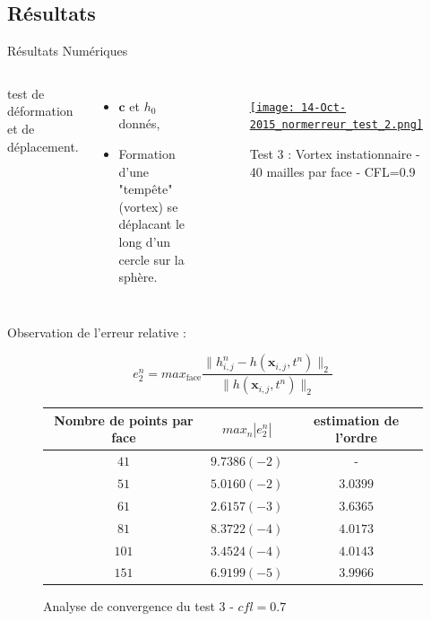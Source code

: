 \documentclass[11pt]{beamer}
\begin{document}
\subsection{Résultats}
\begin{frame}{Résultats Numériques}
\begin{columns}
test de déformation et de déplacement.
\begin{itemize}

\item $\mathbf{c}$ et $h_0$ donnés,

\item Formation d'une "tempête" (vortex) se déplacant le long d'un cercle sur la sphère.
\end{itemize}



\begin{figure}
\href{run:ref_7363145849_test_2.avi}{\texttt{[image: 14-Oct-2015\_normerreur\_test\_2.png]}} 
\caption{Test 3 : Vortex instationnaire - 40 mailles par face - CFL=0.9}
\end{figure}
\end{columns}
\end{frame}

\begin{frame}

Observation de l'erreur relative :

$$e_2^n = max_{\text{face}} \dfrac{ \| h^n_{i,j} - h(\mathbf{x}_{i,j}, t^n ) \|_2 }{\| h(\mathbf{x}_{i,j}, t^n ) \|_2}$$

\begin{figure}
\begin{tabular}{ccc}
Nombre de points par face & $max_n |e_2^n|$ & estimation de l'ordre \\
\hline
\hline
$41$ & $9.7386 (-2)$ & - \\
\hline 
$51$ & $5.0160 (-2)$ & $3.0399$ \\
\hline
$61$ & $2.6157 (-3)$ & $3.6365$ \\
\hline
$81$ & $8.3722 (-4)$ & $4.0173$ \\
\hline
$101$ & $3.4524 (-4)$ & $4.0143$\\
\hline
$151$ & $6.9199 (-5)$ & $3.9966$
\end{tabular}
\caption{Analyse de convergence du test 3 - $cfl = 0.7$}
\end{figure}

\end{frame}
\end{document}
